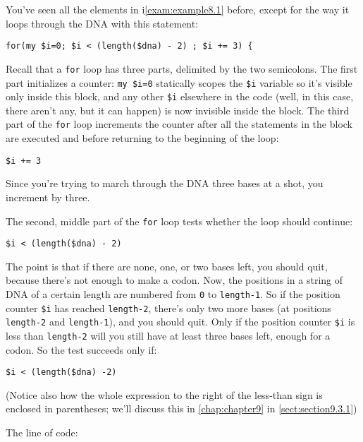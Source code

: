 You've seen all the elements in i\autoref{exam:example8.1} before, except for the way it loops through the DNA with this statement:

\begin{lstlisting}
for(my $i=0; $i < (length($dna) - 2) ; $i += 3) {
\end{lstlisting}

Recall that a \verb|for| loop has three parts, delimited by the two semicolons.  The first part initializes a counter: \verb|my $i=0| statically scopes the \verb|$i| variable so it's visible only inside this block, and any other \verb|$i| elsewhere in the code (well, in this case, there aren't any, but it can happen) is now invisible inside the block. The third part of the \verb|for| loop increments the counter after all the statements in the block are executed and before returning to the beginning of the loop:

\begin{lstlisting}
$i += 3
\end{lstlisting}

Since you're trying to march through the DNA three bases at a shot, you increment by three.

The second, middle part of the \verb|for| loop tests whether the loop should continue:

\begin{lstlisting}
$i < (length($dna) - 2)
\end{lstlisting}

The point is that if there are none, one, or two bases left, you should quit, because there's not enough to make a codon. Now, the positions in a string of DNA of a certain length are numbered from \verb|0| to \verb|length-1|. So if the position counter \verb|$i| has reached \verb|length-2|, there's only two more bases (at positions \verb|length-2| and \verb|length-1|), and you should quit. Only if the position counter \verb|$i| is less than \verb|length-2| will you still have at least three bases left, enough for a codon. So the test succeeds only if:

\begin{lstlisting}
$i < (length($dna) -2)
\end{lstlisting}

(Notice also how the whole expression to the right of the less-than sign is enclosed in parentheses; we'll discuss this in \autoref{chap:chapter9} in \autoref{sect:section9.3.1})

The line of code:

